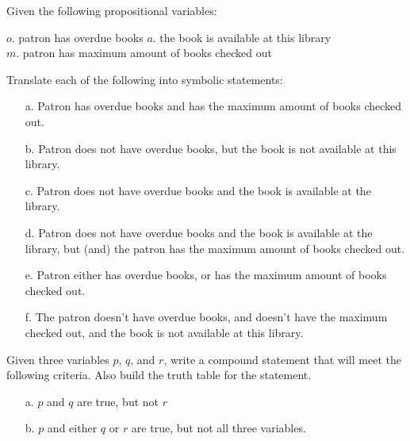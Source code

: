         \begin{questionNOGRADE}{\thequestion}
            Given the following propositional variables:

            \begin{center}
                $o.$ patron has overdue books   \tab{}
                $a.$ the book is available at this library \\
                $m.$ patron has maximum amount of books checked out
            \end{center}

            Translate each of the following into symbolic statements:

            \begin{itemize}
                \item[a.]   Patron has overdue books and has the maximum amount of books checked out.
                \item[b.]   Patron does not have overdue books, but the book is not available at this library.
                \item[c.]   Patron does not have overdue books and the book is available at the library.
                \item[d.]   Patron does not have overdue books and the book is available at the library, but (and) the patron has 	the maximum amount of books checked out.
                \item[e.]   Patron either has overdue books, or has the maximum amount of books checked out.
                \item[f.]   The patron doesn’t have overdue books, and doesn’t have the maximum checked out, and the 		book is not available at this library.
            \end{itemize}
        \end{questionNOGRADE}
        
        \begin{questionNOGRADE}{\thequestion}
            Given three variables $p$, $q$, and $r$, write a compound statement that will meet the following criteria.
            Also build the truth table for the statement.

            \begin{itemize}
                \item[a.]   $p$ and $q$ are true, but not $r$
                \item[b.]   $p$ and either $q$ or $r$ are true, but not all three variables.
            \end{itemize}
        \end{questionNOGRADE}

